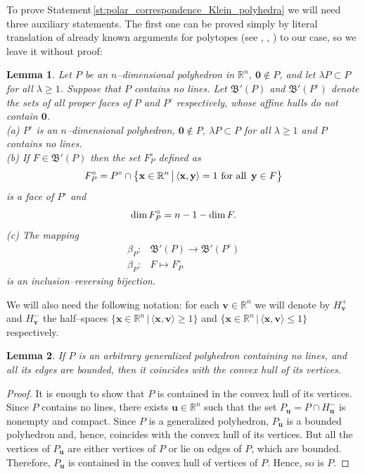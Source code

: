 \documentclass[11pt]{article}
\theoremstyle{definition}
\theoremstyle{remark}
\theoremstyle{plain}
\newtheorem{lemma}{Lemma}
\renewcommand{\vec}[1]{\mathbf{#1}}
\renewcommand{\geq}{\geqslant}
\renewcommand{\leq}{\leqslant}
\renewcommand{\dim}{\textup{dim\,}}
\renewcommand{\dim}{\textup{dim\,}}
\newcommand{\R}{\mathbb{R}}
\newcommand{\faces}{\mathfrak B}
\begin{document}
  To prove Statement\,\ref{st:polar_correspondence_Klein_polyhedra} we will need three
  auxiliary statements. The first one can be proved simply by literal translation of already
  known arguments for polytopes (see \cite{grunbaum}, \cite{mcmullen_shephard}, \cite{ewald})
  to our case, so we leave it without proof:

  \begin{lemma} \label{l:polar_correspondence_literal_translation}
    Let $P$ be an $n$--dimensional polyhedron in $\R^n,\ \vec 0\notin P$, and let
    $\lambda P\subset P$ for all $\lambda\geq 1$. Suppose that $P$ contains no lines. Let
    $\faces'(P)$ and $\faces'(P^\circ)$ denote the sets of all proper faces of $P$ and $P^\circ$
    respectively, whose affine hulls do not contain $\vec 0$.
    \\
    (a) $P^\circ$ is an $n$--dimensional polyhedron, $\vec 0\notin P,\ \lambda P\subset P$
        for all $\lambda\geq 1$ and $P$ contains no lines. \\
    (b) If $F\in\faces'(P)$ then the set $F_P^\circ$ defined as
        \[ F_P^\circ=P^\circ\cap\big\{ \vec x\in\R^n\, \big|\, \langle\vec x,\vec y\rangle=1
           \text{ for all\,\ }\vec y\in F \big\} \]
        is a face of $P^\circ$ and
        \[ \dim F_P^\circ=n-1-\dim F. \]
    (c) The mapping
        \[ \begin{array}{rc}
             \beta_P: & \faces'(P)\rightarrow\faces'(P^\circ) \\
             \beta_P: & F\mapsto F_P^\circ
           \end{array} \]
        is an inclusion--reversing bijection.
  \end{lemma}

  We will also need the following notation: for each $\vec v\in\R^n$ we will denote by
  $H_{\vec v}^+$ and $H_{\vec v}^-$ the half--spaces
  $\{ \vec x\in\R^n\, |\, \langle\vec x,\vec v\rangle\geq 1 \}$ and
  $\{ \vec x\in\R^n\, |\, \langle\vec x,\vec v\rangle\leq 1 \}$ respectively.

  \begin{lemma} \label{l:P_is_a_convex_hull_of_its_vertices}
    If $P$ is an arbitrary generalized polyhedron containing no lines, and all its edges are
    bounded, then it coincides with the convex hull of its vertices.
  \end{lemma}

  \begin{proof}
    It is enough to show that $P$ is contained in the convex hull of its vertices. Since $P$
    contains no lines, there exists $\vec u\in\R^n$ such that the set
    $P_{\vec u}=P\cap H_{\vec u}^-$ is nonempty and compact. Since $P$ is a generalized
    polyhedron, $P_{\vec u}$ is a bounded polyhedron and, hence, coincides with the convex
    hull of its vertices. But all the vertices of $P_{\vec u}$ are either vertices of $P$ or
    lie on edges of $P$, which are bounded. Therefore, $P_{\vec u}$ is contained in the convex
    hull of vertices of $P$. Hence, so is $P$.
  \end{proof}
\end{document}
